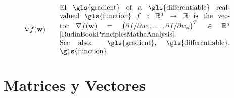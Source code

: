 \begin{align}
	&\nabla f(\weights) & \quad & \parbox{.70\textwidth}{El \gls{gradient} of a \gls{differentiable} real-valued \gls{function} 
		$f: \mathbb{R}^{\featuredim}\rightarrow \mathbb{R}$ is the vector 
		$\nabla f(\weights) = \big( {\partial f}/{\partial \weight_{1}}, \ldots, {\partial f}/{\partial \weight_{\featuredim}}  \big)^{T} \in \mathbb{R}^{\featuredim}$ \cite[Ch. 9]{RudinBookPrinciplesMatheAnalysis}.
	   \\ See also: \gls{gradient}, \gls{differentiable}, \gls{function}.}   \nonumber
\end{align} 
\section*{Matrices y Vectores}

